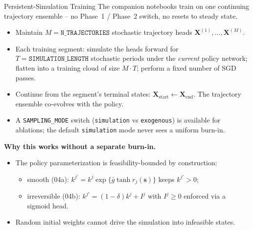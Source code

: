 \documentclass[aspectratio=169,11pt]{beamer}
\newcommand{\emphc}[1]{\textcolor{harvardcrimson}{#1}}
\begin{document}
\begin{frame}{Persistent-Simulation Training}
The companion notebooks train on \emphc{one continuing trajectory ensemble} -- no Phase~1 / Phase~2 switch, no resets to steady state.

\vspace{0.15em}
\begin{itemize}
    \item Maintain $M = \texttt{N\_TRAJECTORIES}$ stochastic trajectory heads $\bm{X}^{(1)}, \ldots, \bm{X}^{(M)}$.
    \item Each \emphc{training segment}: simulate the heads forward for $T = \texttt{SIMULATION\_LENGTH}$ stochastic periods under the \emph{current} policy network; flatten into a training cloud of size $M\!\cdot\!T$; perform a fixed number of SGD passes.
    \item Continue from the segment's terminal states: $\bm{X}_{\mathrm{start}} \leftarrow \bm{X}_{\mathrm{end}}$. The trajectory ensemble \emphc{co-evolves} with the policy.
    \item A \texttt{SAMPLING\_MODE} switch (\texttt{simulation} vs \texttt{exogenous}) is available for ablations; the default \texttt{simulation} mode never sees a uniform burn-in.
\end{itemize}

\vspace{0.15em}
\textbf{Why this works without a separate burn-in.}
\begin{itemize}
    \item The policy parameterization is feasibility-bounded by construction:
    \begin{itemize}\itemsep1pt
        \item smooth (04a): $k^{j\prime} = k^j \exp\{\bar g \tanh r_j(\bm{s})\}$ keeps $k^{j\prime} > 0$;
        \item irreversible (04b): $k^{j\prime} = (1-\delta)k^j + I^j$ with $I^j \ge 0$ enforced via a sigmoid head.
    \end{itemize}
    \item Random initial weights cannot drive the simulation into infeasible states.
\end{itemize}
\end{frame}
\end{document}
